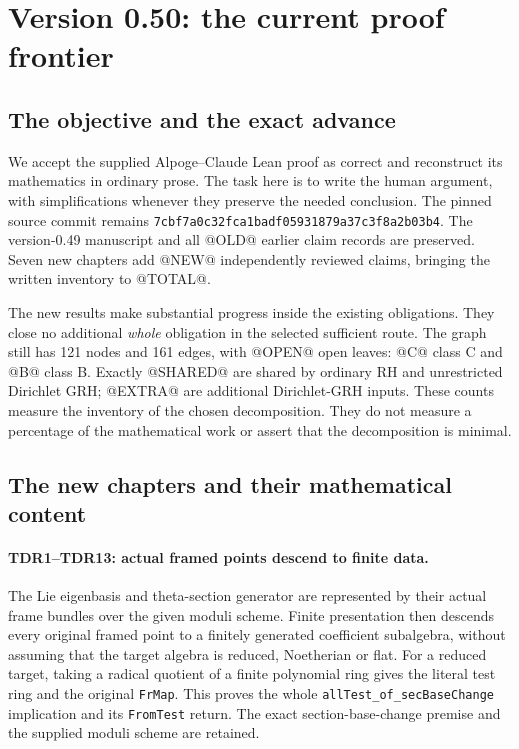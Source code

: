 \section{Version 0.50: the current proof frontier}
\label{sec:dependency-audit-v50}

\subsection{The objective and the exact advance}

We accept the supplied Alpoge--Claude Lean proof as correct and reconstruct
its mathematics in ordinary prose. The task here is to write the human
argument, with simplifications whenever they preserve the needed conclusion.
The pinned source commit remains
\texttt{7cbf7a0c32fca1badf05931879a37c3f8a2b03b4}.
The version-0.49 manuscript and all @OLD@ earlier claim records are
preserved. Seven new chapters add @NEW@ independently reviewed claims,
bringing the written inventory to @TOTAL@.

The new results make substantial progress inside the existing obligations.
They close no additional \emph{whole} obligation in the selected sufficient
route. The graph still has 121 nodes and 161 edges, with @OPEN@ open leaves:
@C@ class C and @B@ class B. Exactly @SHARED@ are shared by ordinary RH and
unrestricted Dirichlet GRH; @EXTRA@ are additional Dirichlet-GRH inputs.
These counts measure the inventory of the chosen decomposition. They do
not measure a percentage of the mathematical work or assert that the
decomposition is minimal.

\subsection{The new chapters and their mathematical content}

\paragraph{TDR1--TDR13: actual framed points descend to finite data.}
The Lie eigenbasis and theta-section generator are represented by their
actual frame bundles over the given moduli scheme. Finite presentation
then descends every original framed point to a finitely generated
coefficient subalgebra, without assuming that the target algebra is
reduced, Noetherian or flat. For a reduced target, taking a radical
quotient of a finite polynomial ring gives the literal test ring and
the original \texttt{FrMap}. This proves the whole
\texttt{allTest\_of\_secBaseChange} implication and its
\texttt{FromTest} return. The exact section-base-change premise and
the supplied moduli scheme are retained.

